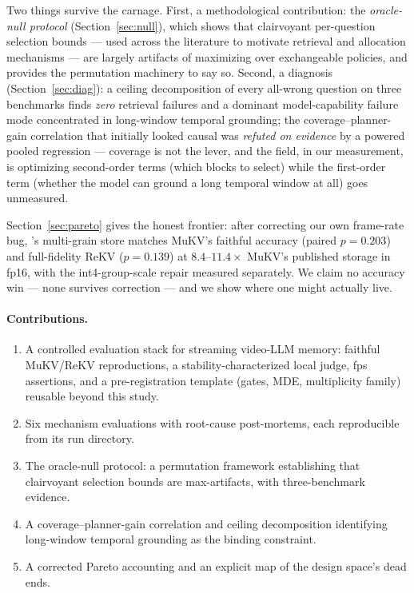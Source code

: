 Two things survive the carnage. First, a methodological contribution: the \emph{oracle-null protocol} (Section~\ref{sec:null}), which shows that clairvoyant per-question selection bounds — used across the literature to motivate retrieval and allocation mechanisms — are largely artifacts of maximizing over exchangeable policies, and provides the permutation machinery to say so. Second, a diagnosis (Section~\ref{sec:diag}): a ceiling decomposition of every all-wrong question on three benchmarks finds \emph{zero} retrieval failures and a dominant model-capability failure mode concentrated in long-window temporal grounding; the coverage--planner-gain correlation that initially looked causal was \emph{refuted on evidence} by a powered pooled regression — coverage is not the lever, and the field, in our measurement, is optimizing second-order terms (which blocks to select) while the first-order term (whether the model can ground a long temporal window at all) goes unmeasured.

Section~\ref{sec:pareto} gives the honest frontier: after correcting our own frame-rate bug, \sys's multi-grain store matches MuKV's faithful accuracy (paired $p{=}0.203$) and full-fidelity ReKV ($p{=}0.139$) at $8.4$--$11.4\times$ MuKV's published storage in fp16, with the int4-group-scale repair measured separately. We claim no accuracy win — none survives correction — and we show where one might actually live.

\paragraph{Contributions.}
\begin{enumerate}
\item A controlled evaluation stack for streaming video-LLM memory: faithful MuKV/ReKV reproductions, a stability-characterized local judge, fps assertions, and a pre-registration template (gates, MDE, multiplicity family) reusable beyond this study.
\item Six mechanism evaluations with root-cause post-mortems, each reproducible from its run directory.
\item The oracle-null protocol: a permutation framework establishing that clairvoyant selection bounds are max-artifacts, with three-benchmark evidence.
\item A coverage--planner-gain correlation and ceiling decomposition identifying long-window temporal grounding as the binding constraint.
\item A corrected Pareto accounting and an explicit map of the design space's dead ends.
\end{enumerate}
